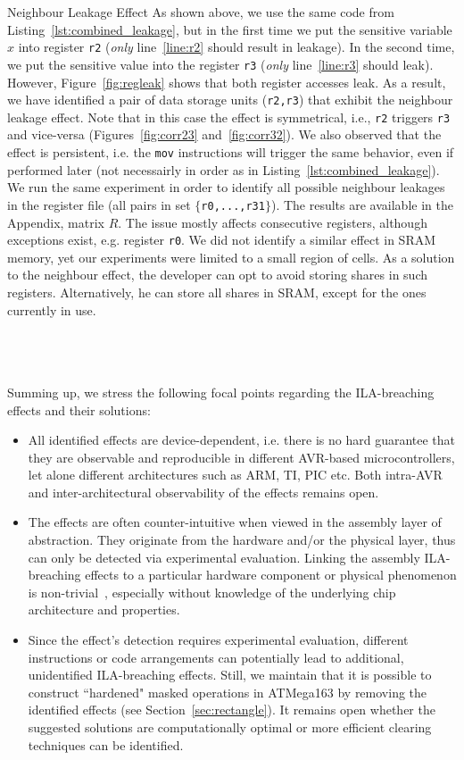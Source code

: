 \begin{subsection}{Neighbour Leakage Effect}
As shown above, we use the same code from Listing~\ref{lst:combined_leakage}, but in the first time we put the sensitive variable $x$ into register \texttt{r2} (\emph{only} line~\ref{line:r2} should result in leakage).
In the second time, we put the sensitive value into the register \texttt{r3} (\emph{only} line~\ref{line:r3} should leak). However, Figure~\ref{fig:regleak} shows that both register accesses leak.
As a result, we have identified a pair of data storage units (\texttt{r2,r3}) that exhibit the neighbour leakage effect. Note that in this case the effect is symmetrical, i.e., \texttt{r2} triggers \texttt{r3} and vice-versa (Figures~\ref{fig:corr23} and~\ref{fig:corr32}). We also observed that the effect is persistent, i.e. the \texttt{mov} instructions will trigger the same behavior, even if performed later (not necessairly in order as in Listing~\ref{lst:combined_leakage}). We run the same experiment in order to identify all possible neighbour leakages in the register file (all pairs in set $\{$\texttt{r0,...,r31}$\}$). The results are available in the Appendix, matrix $R$. The issue mostly affects consecutive registers, although exceptions exist, e.g. register \texttt{r0}. We did not identify a similar effect in SRAM memory, yet our experiments were limited to a small region of cells. As a solution to the neighbour effect, the developer can opt to avoid storing shares in such registers. Alternatively, he can store all shares in SRAM, except for the ones currently in use. 
\end{subsection}\\\\\\
Summing up, we stress the following focal points regarding the ILA-breaching effects and their solutions:
\begin{itemize}
\item All identified effects are device-dependent, i.e. there is no hard guarantee that they are observable and reproducible in different AVR-based microcontrollers, let alone different architectures such as ARM, TI, PIC etc. Both intra-AVR and inter-architectural observability of the effects remains open.
\item The effects are often counter-intuitive when viewed in the assembly layer of abstraction. They originate from the hardware and/or the physical layer, thus can only be detected via experimental evaluation. Linking the assembly ILA-breaching effects to a particular hardware component or physical phenomenon is non-trivial~\cite{DBLP:conf/eurocrypt/RenauldSVKF11,DBLP:phd/dnb/Stottinger12}, especially without knowledge of the underlying chip architecture and properties.
\item  Since the effect's detection requires experimental evaluation, different instructions or code arrangements can potentially lead to additional, unidentified ILA-breaching effects. Still, we maintain that it is possible to construct ``hardened" masked operations in ATMega163 by removing the identified effects (see Section~\ref{sec:rectangle}). It remains open whether the suggested solutions are computationally optimal or more efficient clearing techniques can be identified.
\end{itemize}

